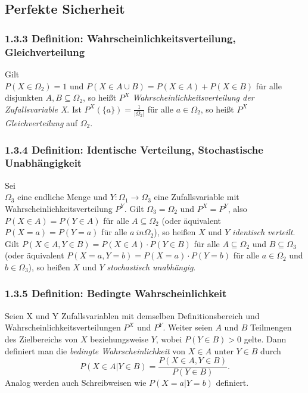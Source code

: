\documentclass[12pt,a4paper]{scrartcl}
\begin{document}
        \subsection{Perfekte Sicherheit}
            \subsubsection*{1.3.3 Definition: Wahrscheinlichkeitsverteilung, Gleichverteilung}
                Gilt \\ $P(X \in \Omega_2)=1$ und $P(X \in A \cup B)=P(X \in A)+P(X \in B)$ für alle disjunkten $A, B \subseteq \Omega_2$, so heißt $P^X$ \emph{Wahrscheinlichkeitsverteilung der Zufallsvariable X}. Ist $P^X( \lbrace a \rbrace)=\frac{1}{| \Omega_2 |}$ für alle $a \in \Omega_2$, so heißt $P^X$ \emph{Gleichverteilung} auf $\Omega_2$.
            \subsubsection*{1.3.4 Definition: Identische Verteilung, Stochastische Unabhängigkeit}
                Sei \\ $\Omega_3$ eine endliche Menge und $Y: \Omega_1 \rightarrow \Omega_3$ eine Zufallsvariable mit Wahrscheinlichkeitsverteilung $P^Y.$ Gilt $\Omega_3 = \Omega_2$ und $P^X = P^Y$, also $P(X \in A) = P(Y \in A)$ für alle $A \subseteq \Omega_2$ (oder äquivalent $P(X=a)=P(Y=a)$ für alle $a \ in \Omega_2$), so heißen $X$ und $Y$ \emph{identisch verteilt}. Gilt $P(X \in A, Y \in B) = P(X \in A) \cdot P(Y \in B)$ für alle $A \subseteq \Omega_2$ und $B \subseteq \Omega_3$ (oder äquivalent $P(X=a,Y=b)=P(X=a) \cdot P(Y=b)$ für alle $a \in \Omega_2$ und $b \in \Omega_3$), so heißen $X$ und $Y$ \emph{stochastisch unabhängig}.
            \subsubsection*{1.3.5 Definition: Bedingte Wahrscheinlichkeit}
                Seien X und Y Zufallsvariablen mit demselben Definitionsbereich und Wahrscheinlichkeitsverteilungen $P^X$ und $P^Y$. Weiter seien $A$ und $B$ Teilmengen des Zielbereichs von $X$ beziehungsweise $Y$, wobei $P(Y \in B) > 0$ gelte. Dann definiert man die \emph{bedingte Wahrscheinlichkeit} von $X \in A$ unter $Y \in B$ durch \[P(X \in A | Y \in B)= \frac{P(X \in A, Y \in B)}{P(Y \in B)}.\] Analog werden auch Schreibweisen wie $P(X=a|Y=b)$ definiert.
\end{document}
